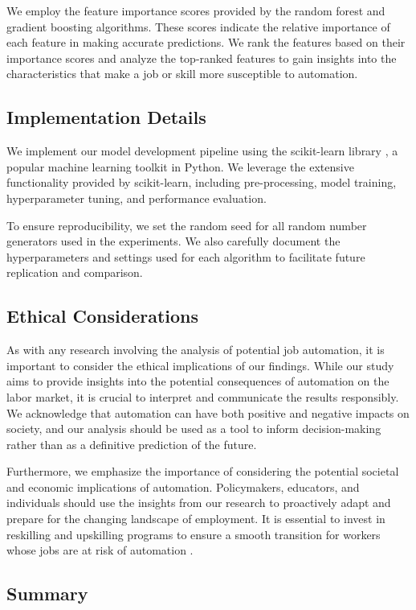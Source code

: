 \documentclass{article}
\begin{document}
We employ the feature importance scores provided by the random forest and gradient boosting algorithms. These scores indicate the relative importance of each feature in making accurate predictions. We rank the features based on their importance scores and analyze the top-ranked features to gain insights into the characteristics that make a job or skill more susceptible to automation.

\subsection{Implementation Details}

We implement our model development pipeline using the scikit-learn library \cite{scikit-learn}, a popular machine learning toolkit in Python. We leverage the extensive functionality provided by scikit-learn, including pre-processing, model training, hyperparameter tuning, and performance evaluation.

To ensure reproducibility, we set the random seed for all random number generators used in the experiments. We also carefully document the hyperparameters and settings used for each algorithm to facilitate future replication and comparison.

\subsection{Ethical Considerations}

As with any research involving the analysis of potential job automation, it is important to consider the ethical implications of our findings. While our study aims to provide insights into the potential consequences of automation on the labor market, it is crucial to interpret and communicate the results responsibly. We acknowledge that automation can have both positive and negative impacts on society, and our analysis should be used as a tool to inform decision-making rather than as a definitive prediction of the future.

Furthermore, we emphasize the importance of considering the potential societal and economic implications of automation. Policymakers, educators, and individuals should use the insights from our research to proactively adapt and prepare for the changing landscape of employment. It is essential to invest in reskilling and upskilling programs to ensure a smooth transition for workers whose jobs are at risk of automation \cite{bessen2019ai}.

\subsection{Summary}
\end{document}
